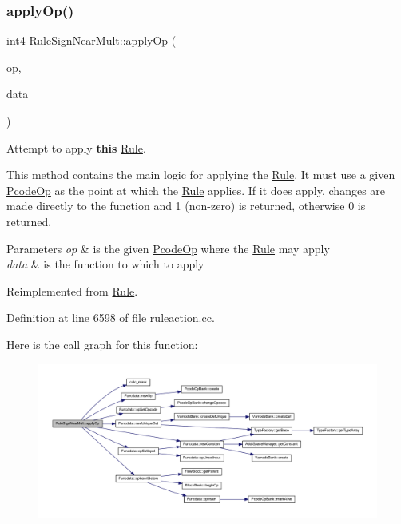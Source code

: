 \subsubsection{\texorpdfstring{applyOp()}{applyOp()}}
{\footnotesize\ttfamily int4 Rule\+Sign\+Near\+Mult\+::apply\+Op (\begin{DoxyParamCaption}\item[{\mbox{\hyperlink{class_pcode_op}{Pcode\+Op}} $\ast$}]{op,  }\item[{\mbox{\hyperlink{class_funcdata}{Funcdata}} \&}]{data }\end{DoxyParamCaption})\hspace{0.3cm}{\ttfamily [virtual]}}



Attempt to apply {\bfseries{this}} \mbox{\hyperlink{class_rule}{Rule}}. 

This method contains the main logic for applying the \mbox{\hyperlink{class_rule}{Rule}}. It must use a given \mbox{\hyperlink{class_pcode_op}{Pcode\+Op}} as the point at which the \mbox{\hyperlink{class_rule}{Rule}} applies. If it does apply, changes are made directly to the function and 1 (non-\/zero) is returned, otherwise 0 is returned. 
\begin{DoxyParams}{Parameters}
{\em op} & is the given \mbox{\hyperlink{class_pcode_op}{Pcode\+Op}} where the \mbox{\hyperlink{class_rule}{Rule}} may apply \\
\hline
{\em data} & is the function to which to apply \\
\hline
\end{DoxyParams}


Reimplemented from \mbox{\hyperlink{class_rule_a4e3e61f066670175009f60fb9dc60848}{Rule}}.



Definition at line 6598 of file ruleaction.\+cc.

Here is the call graph for this function\+:
\nopagebreak
\begin{figure}[H]
\begin{center}
\leavevmode
\includegraphics[width=350pt]{class_rule_sign_near_mult_a37aa70b7da5c91e0d7f8ea81a98869f6_cgraph}
\end{center}
\end{figure}
\mbox{\label{class_rule_sign_near_mult_a53b45d474b33bcf2fd77a382717d0365}} 
